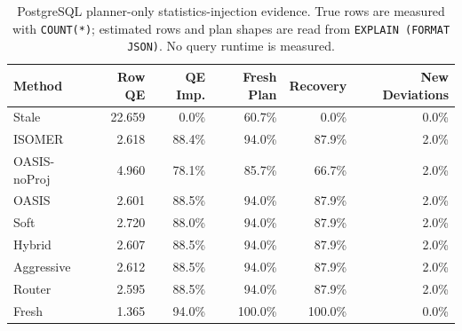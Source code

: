 \begin{table}[t]
  \centering
  \small
  \caption{PostgreSQL planner-only statistics-injection evidence. True rows are measured with \texttt{COUNT(*)}; estimated rows and plan shapes are read from \texttt{EXPLAIN (FORMAT JSON)}. No query runtime is measured.}
  \label{tab:postgres_planner_stats_injection}
  \setlength{\tabcolsep}{4pt}
  \begin{tabular}{lrrrrr}
    \toprule
    Method & Row QE & QE Imp. & Fresh Plan & Recovery & New Deviations \\
    \midrule
    Stale & 22.659 & 0.0\% & 60.7\% & 0.0\% & 0.0\% \\
    ISOMER & 2.618 & 88.4\% & 94.0\% & 87.9\% & 2.0\% \\
    OASIS-noProj & 4.960 & 78.1\% & 85.7\% & 66.7\% & 2.0\% \\
    OASIS & 2.601 & 88.5\% & 94.0\% & 87.9\% & 2.0\% \\
    Soft & 2.720 & 88.0\% & 94.0\% & 87.9\% & 2.0\% \\
    Hybrid & 2.607 & 88.5\% & 94.0\% & 87.9\% & 2.0\% \\
    Aggressive & 2.612 & 88.5\% & 94.0\% & 87.9\% & 2.0\% \\
    Router & 2.595 & 88.5\% & 94.0\% & 87.9\% & 2.0\% \\
    Fresh & 1.365 & 94.0\% & 100.0\% & 100.0\% & 0.0\% \\
    \bottomrule
  \end{tabular}
\end{table}

